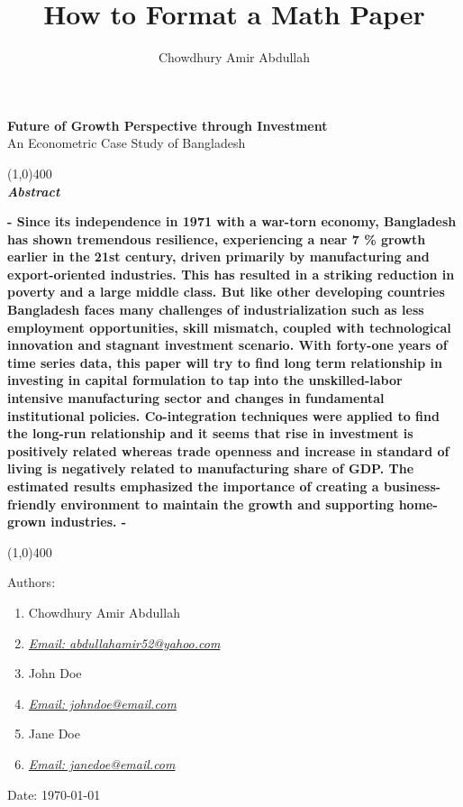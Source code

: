 \documentclass[11pt,a4paper]{article}
\author{Chowdhury Amir Abdullah}
\title{How to Format a Math Paper}
\begin{document}
\begin{titlepage}

\begin{center}
\Huge {\textbf{Future of Growth Perspective through Investment }} \\ [6 pt]
\Large {An Econometric Case Study of Bangladesh} \\ 
\vfill

\line(1,0){400} \\ [1 mm]


\Large {\textbf{\textit{Abstract}}}\\ [3 mm]
\end{center}

\normalsize {\textbf{ - Since its independence in 1971 with a war-torn economy, Bangladesh has shown tremendous resilience, experiencing a near 7 \% growth earlier in the 21st century, driven primarily by manufacturing and export-oriented industries. This has resulted in a striking reduction in poverty and a large middle class. But like other developing countries Bangladesh faces many challenges of industrialization such as less employment opportunities, skill mismatch, coupled with technological innovation and stagnant investment scenario. With forty-one years of time series data, this paper will try to find long term relationship in investing in capital formulation to tap into the unskilled-labor intensive manufacturing sector and changes in fundamental institutional policies. Co-integration techniques were applied to find the long-run relationship and it seems that rise in investment is positively related whereas trade openness and increase in standard of living is negatively related to manufacturing share of GDP. The estimated results emphasized the importance of creating a business-friendly environment to maintain the growth and supporting home-grown industries.  - }}

\line(1,0){400} \\ [1 mm]

\vfill

\flushleft 
{
Authors: 


\begin{enumerate}
\item Chowdhury Amir Abdullah 
\item[] \textit{\small {\href{mailto:abdullahamir52@yahoo.com}{Email: abdullahamir52@yahoo.com}}}

\item John Doe
\item[] \textit{\small {\href{mailto:johndoe@email.com}{Email: johndoe@email.com}}}

\item Jane Doe
\item[] \textit{\small {\href{mailto:janedoe@email.com}{Email: janedoe@email.com}}}

\end{enumerate}

}




Date: \today


\end{titlepage}
\end{document}
